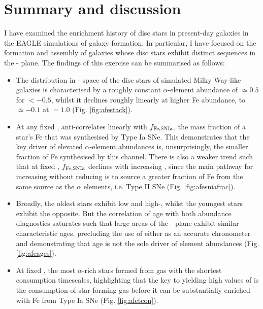 \section{Summary and discussion}
\label{sec:summary_and_discussion}

I have examined the enrichment history of disc stars in present-day galaxies in the EAGLE simulations of galaxy formation. In particular, I have focused on the formation and assembly of galaxies whose disc stars exhibit distinct sequences in the \afe{}-\feh{} plane. The findings of this exercise can be summarised as follows:

\begin{itemize}

\item The distribution in \afe{}-\feh{} space of the disc stars of simulated Milky Way-like galaxies is characterised by a roughly constant $\alpha$-element abundance of \afe{}$\simeq 0.5$ for \feh{}$< -0.5$, whilst it declines roughly linearly at higher Fe abundance, to \afe{}$\simeq -0.1$ at \feh{}$=1.0$ (Fig. \ref{fig:afestack}).

\item At any fixed \feh{}, \afe{} anti-correlates linearly with $f_{\rm Fe,SNIa}$, the mass fraction of a star's Fe that was synthesised by Type Ia SNe. This demonstrates that the key driver of elevated $\alpha$-element abundances is, unsurprisingly, the smaller fraction of Fe synthesised by this channel. There is also a weaker trend such that at fixed \afe{}, $f_{\rm Fe,SNIa}$ declines with increasing \feh{}, since the main pathway for increasing \feh{} without reducing \afe{} is to source a greater fraction of Fe from the same source as the $\alpha$ elements, i.e. Type II SNe (Fig. \ref{fig:afesniafrac}).

\item Broadly, the oldest stars exhibit low \feh{} and high-\afe{}, whilst the youngest stars exhibit the opposite. But the correlation of age with both abundance diagnostics saturates such that large areas of the \afe{}-\feh{} plane exhibit similar characteristic ages, precluding the use of either as an accurate chronometer and demonstrating that age is not the sole driver of element abundances (Fig. \ref{fig:afeages}).

\item At fixed \feh{}, the most $\alpha$-rich stars formed from gas with the shortest consumption timescales, highlighting that the key to yielding high values of \afe{} is the consumption of star-forming gas before it can be substantially enriched with Fe from Type Ia SNe (Fig. \ref{fig:afetcon}).


\end{itemize}
